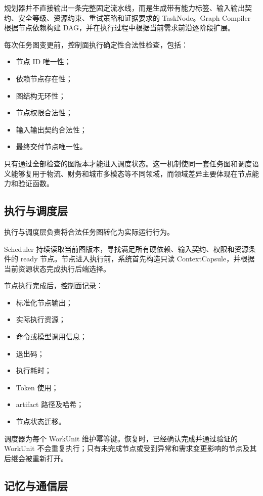 \documentclass[UTF8,a4paper,12pt,oneside]{ctexbook}
\begin{document}
规划器并不直接输出一条完整固定流水线，而是生成带有能力标签、输入输出契约、安全等级、资源约束、重试策略和证据要求的 TaskNode。Graph Compiler 根据节点依赖构建 DAG，并在执行过程中根据当前需求前沿逐阶段扩展。

每次任务图变更前，控制面执行确定性合法性检查，包括：

\begin{itemize}
    \item 节点 ID 唯一性；
    \item 依赖节点存在性；
    \item 图结构无环性；
    \item 节点权限合法性；
    \item 输入输出契约合法性；
    \item 最终交付节点唯一性。
\end{itemize}

只有通过全部检查的图版本才能进入调度状态。这一机制使同一套任务图和调度语义能够复用于物流、财务和城市多模态等不同领域，而领域差异主要体现在节点能力和验证函数。


\subsection{执行与调度层}

执行与调度层负责将合法任务图转化为实际运行行为。

Scheduler 持续读取当前图版本，寻找满足所有硬依赖、输入契约、权限和资源条件的 ready 节点。节点进入执行前，系统首先构造只读 ContextCapsule，并根据当前资源状态完成执行后端选择。

节点执行完成后，控制面记录：

\begin{itemize}
    \item 标准化节点输出；
    \item 实际执行资源；
    \item 命令或模型调用信息；
    \item 退出码；
    \item 执行耗时；
    \item Token 使用；
    \item artifact 路径及哈希；
    \item 节点状态迁移。
\end{itemize}

调度器为每个 WorkUnit 维护幂等键。恢复时，已经确认完成并通过验证的 WorkUnit 不会重复执行；只有未完成节点或受到异常和需求变更影响的节点及其后继会被重新打开。


\subsection{记忆与通信层}
\end{document}
